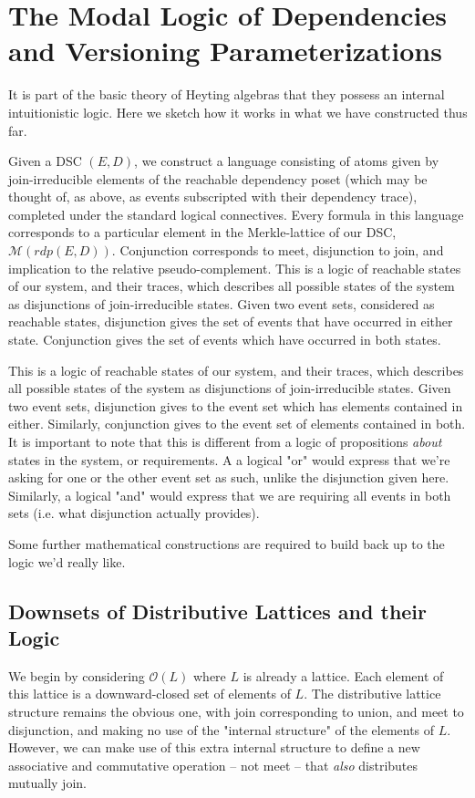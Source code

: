 \documentclass[hoptionsi,review,format=sigplan]{acmart}
\theoremstyle{definition}
\newcommand{\Mcc}{\mathcal{M}}
\newcommand{\Oc}{\mathcal{O}}
\begin{document}
\section{The Modal Logic of Dependencies and Versioning Parameterizations}
It is part of the basic theory of Heyting algebras that they possess an internal intuitionistic logic. Here we sketch how it works in what we have constructed thus far.

Given a DSC \((E,D)\), we construct a language consisting of atoms given by join-irreducible elements of the reachable dependency poset (which may be thought of, as above, as events subscripted with their dependency trace), completed under the standard logical connectives. Every formula in this language corresponds to a particular element in the Merkle-lattice of our DSC, \(\Mcc(rdp(E,D))\).  Conjunction corresponds to meet, disjunction to join, and implication to the relative pseudo-complement. This is a logic of reachable states of our system, and their traces, which describes all possible states of the system as disjunctions of join-irreducible states. Given two event sets, considered as reachable states, disjunction gives the set of events that have occurred in either state. Conjunction gives the set of events which have occurred in both states.

This is a logic of reachable states of our system, and their traces, which describes all possible states of the system as disjunctions of join-irreducible states. Given two event sets, disjunction gives to the event set which has elements contained in either. Similarly, conjunction gives to the event set of elements contained in both.  It is important to note that this is different from a logic of propositions \textit{about} states in the system, or requirements. A a logical "or"  would express that we're asking for one or the other event set as such, unlike the disjunction given here. Similarly, a logical "and" would express that we are requiring all events in both sets (i.e. what disjunction actually provides).

Some further mathematical constructions are required to build back up to the logic we'd really like.

\subsection{Downsets of Distributive Lattices and their Logic}

We begin by considering \(\Oc(L)\) where \(L\) is already a lattice. Each element of this lattice is a downward-closed set of elements of \(L\). The distributive lattice structure remains the obvious one, with join corresponding to union, and meet to disjunction, and making no use of the "internal structure" of the elements of \(L\). However, we can make use of this extra internal structure to define a new associative and commutative operation -- not meet -- that \textit{also} distributes mutually join. 
\end{document}
